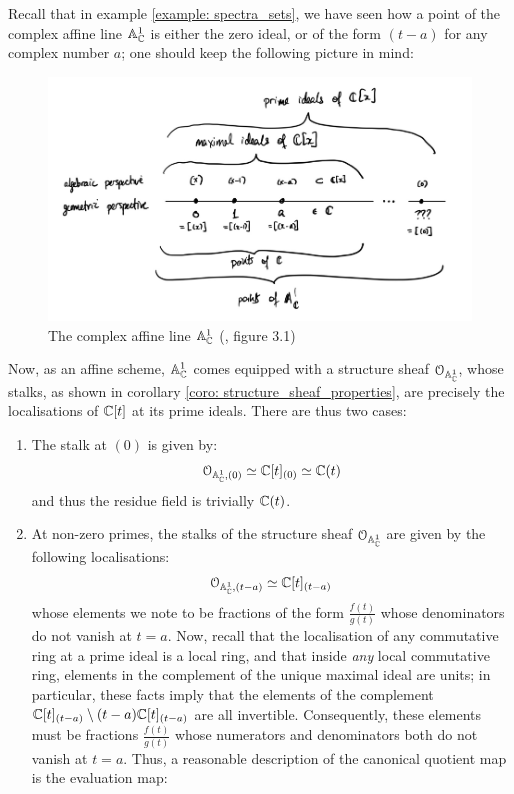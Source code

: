                 \begin{example}
                    Recall that in example \ref{example: spectra_sets}, we have seen how a point of the complex affine line $\mathbb{A}^1_{\mathbb{C}}$ is either the zero ideal, or of the form $(t - a)$ for any complex number $a$; one should keep the following picture in mind:
                        \begin{figure}[H]
    				        \centering
    				        \includegraphics[width=\linewidth,height=\textheight,keepaspectratio]{Figures/complex affine line.png}
    				        \caption{The complex affine line $\mathbb{A}^1_{\mathbb{C}}$ (\cite{risingsea}, figure 3.1)}
    				        \label{fig: complex_affine_line_stalks}
    				    \end{figure}
				    \noindent
				    Now, as an affine scheme, $\mathbb{A}^1_{\mathbb{C}}$ comes equipped with a structure sheaf $\mathcal{O}_{\mathbb{A}^1_{\mathbb{C}}}$, whose stalks, as shown in corollary \ref{coro: structure_sheaf_properties}, are precisely the localisations of $\mathbb{C}[t]$ at its prime ideals. There are thus two cases:
				        \begin{enumerate}
				            \item The stalk at $(0)$ is given by:
				                $$\mathcal{O}_{\mathbb{A}^1_{\mathbb{C}}, (0)} \simeq \mathbb{C}[t]_{(0)} \simeq \mathbb{C}(t)$$
			                and thus the residue field is trivially $\mathbb{C}(t)$.
				            \item At non-zero primes, the stalks of the structure sheaf $\mathcal{O}_{\mathbb{A}^1_{\mathbb{C}}}$ are given by the following localisations:
				                $$\mathcal{O}_{\mathbb{A}^1_{\mathbb{C}}, (t - a)} \simeq \mathbb{C}[t]_{(t - a)}$$
			                whose elements we note to be fractions of the form $\frac{f(t)}{g(t)}$ whose denominators do not vanish at $t = a$. Now, recall that the localisation of any commutative ring at a prime ideal is a local ring, and that inside \textit{any} local commutative ring, elements in the complement of the unique maximal ideal are units; in particular, these facts imply that the elements of the complement $\mathbb{C}[t]_{(t - a)} \setminus (t - a)\mathbb{C}[t]_{(t - a)}$ are all invertible. Consequently, these elements must be fractions $\frac{f(t)}{g(t)}$ whose numerators and denominators both do not vanish at $t = a$. Thus, a reasonable description of the canonical quotient map is the evaluation map:

\end{enumerate}
\end{example}
